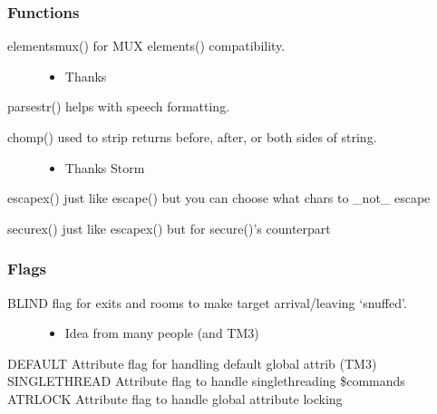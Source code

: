 \documentclass[letterpaper,10pt,english]{sphinxmanual}
\begin{document}
\subsubsection{Functions}
\label{\detokenize{changelog:id13}}\begin{description}
\item[{elementsmux() \sphinxhyphen{} for MUX elements() compatibility.}] \leavevmode\begin{itemize}
\item {} 
\sphinxAtStartPar
Thanks 

\end{itemize}

\end{description}

\sphinxAtStartPar
parsestr() \sphinxhyphen{}  helps with speech formatting.
\begin{description}
\item[{chomp() \sphinxhyphen{} used to strip returns before, after, or both sides of string.}] \leavevmode\begin{itemize}
\item {} 
\sphinxAtStartPar
Thanks Storm

\end{itemize}

\end{description}

\sphinxAtStartPar
escapex() \sphinxhyphen{} just like escape() but you can choose what chars to \_not\_ escape

\sphinxAtStartPar
securex() \sphinxhyphen{} just like escapex() but for secure()’s counterpart


\subsubsection{Flags}
\label{\detokenize{changelog:id14}}\begin{description}
\item[{BLIND \sphinxhyphen{} flag for exits and rooms to make target arrival/leaving ‘snuffed’.}] \leavevmode\begin{itemize}
\item {} 
\sphinxAtStartPar
Idea from many people (and TM3)

\end{itemize}

\end{description}

\sphinxAtStartPar
DEFAULT \sphinxhyphen{} Attribute flag for handling default global attrib (TM3)
SINGLETHREAD \sphinxhyphen{} Attribute flag to handle single\sphinxhyphen{}threading \$commands
ATRLOCK \sphinxhyphen{} Attribute flag to handle global attribute locking
\end{document}
